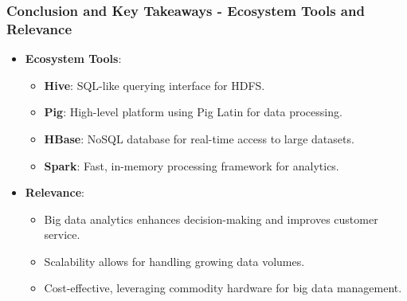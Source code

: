 \documentclass[aspectratio=169]{beamer}
\begin{document}
\begin{frame}[fragile]
    \frametitle{Conclusion and Key Takeaways - Ecosystem Tools and Relevance}
    \begin{itemize}
        \item \textbf{Ecosystem Tools}:
        \begin{itemize}
            \item \textbf{Hive}: SQL-like querying interface for HDFS.
            \item \textbf{Pig}: High-level platform using Pig Latin for data processing.
            \item \textbf{HBase}: NoSQL database for real-time access to large datasets.
            \item \textbf{Spark}: Fast, in-memory processing framework for analytics.
        \end{itemize}
        
        \item \textbf{Relevance}:
        \begin{itemize}
            \item Big data analytics enhances decision-making and improves customer service.
            \item Scalability allows for handling growing data volumes.
            \item Cost-effective, leveraging commodity hardware for big data management.
        \end{itemize}
    \end{itemize}
\end{frame}
\end{document}
